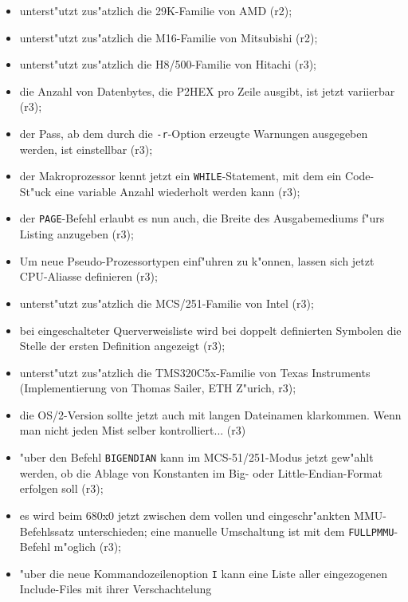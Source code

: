 \documentclass[12pt,a4paper,twoside]{report}
\newcommand{\tty}[1]{{\tt #1}}
\begin{document}
{\begin{itemize}
{\begin{itemize}
{            Stern gekennzeichnet (r2);}
      \item{unterst"utzt zus"atzlich die 29K-Familie von AMD (r2);}
      \item{unterst"utzt zus"atzlich die M16-Familie von Mitsubishi (r2);}
      \item{unterst"utzt zus"atzlich die H8/500-Familie von Hitachi (r3);}
      \item{die Anzahl von Datenbytes, die P2HEX pro Zeile ausgibt, ist
            jetzt variierbar (r3);}
      \item{der Pass, ab dem durch die \tty{-r}-Option erzeugte Warnungen
            ausgegeben werden, ist einstellbar (r3);}
      \item{der Makroprozessor kennt jetzt ein \tty{WHILE}-Statement,
            mit dem ein Code-St"uck eine variable Anzahl wiederholt werden
	    kann (r3);}
      \item{der \tty{PAGE}-Befehl erlaubt es nun auch, die Breite des
            Ausgabemediums f"urs Listing anzugeben (r3);}
      \item{Um neue Pseudo-Prozessortypen einf"uhren zu k"onnen, lassen
            sich jetzt CPU-Aliasse definieren (r3);}
      \item{unterst"utzt zus"atzlich die MCS/251-Familie von Intel (r3);}
      \item{bei eingeschalteter Querverweisliste wird bei doppelt
            definierten Symbolen die Stelle der ersten Definition
	    angezeigt (r3);}
      \item{unterst"utzt zus"atzlich die TMS320C5x-Familie von Texas
            Instruments (Implementierung von Thomas Sailer, ETH Z"urich,
            r3);}
      \item{die OS/2-Version sollte jetzt auch mit langen Dateinamen
            klarkommen.  Wenn man nicht jeden Mist selber kontrolliert...
	    (r3)}
      \item{"uber den Befehl \tty{BIGENDIAN} kann im MCS-51/251-Modus
            jetzt gew"ahlt werden, ob die Ablage von Konstanten im Big- 
            oder Little-Endian-Format erfolgen soll (r3);}
      \item{es wird beim 680x0 jetzt zwischen dem vollen und eingeschr"ankten 
            MMU-Befehlssatz unterschieden; eine manuelle Umschaltung ist mit dem 
            \tty{FULLPMMU}-Befehl m"oglich (r3);}
      \item{"uber die neue Kommandozeilenoption \tty{I} kann eine Liste
            aller eingezogenen Include-Files mit ihrer Verschachtelung
}
\end{itemize}}
\end{itemize}}
\end{document}
